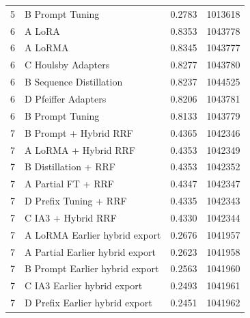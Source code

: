 \documentclass[11pt, oneside]{article}
\begin{document}
\begin{longtable}{clrr}
5 & B Prompt Tuning & 0.2783 & 1013618 \\
6 & A LoRA  & 0.8353 & 1043778 \\
6 & A LoRMA  & 0.8345 & 1043777 \\
6 & C Houlsby Adapters & 0.8277 & 1043780 \\
6 & B Sequence Distillation & 0.8237 & 1044525 \\
6 & D Pfeiffer Adapters & 0.8206 & 1043781 \\
6 & B Prompt Tuning & 0.8133 & 1043779 \\
7 & B Prompt + Hybrid RRF & 0.4365 & 1042346 \\
7 & A LoRMA + Hybrid RRF & 0.4353 & 1042349 \\
7 & B Distillation + RRF & 0.4353 & 1042352 \\
7 & A Partial FT + RRF & 0.4347 & 1042347 \\
7 & D Prefix Tuning + RRF & 0.4335 & 1042343 \\
7 & C IA3 + Hybrid RRF & 0.4330 & 1042344 \\
7 & A LoRMA Earlier hybrid export & 0.2676 & 1041957 \\
7 & A Partial Earlier hybrid export & 0.2623 & 1041958 \\
7 & B Prompt Earlier hybrid export & 0.2563 & 1041960 \\
7 & C IA3 Earlier hybrid export & 0.2493 & 1041961 \\
7 & D Prefix Earlier hybrid export & 0.2451 & 1041962 \\
\bottomrule\end{longtable}\endgroup
\end{document}
